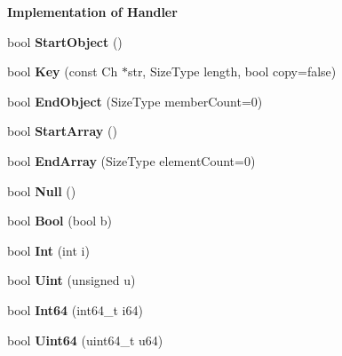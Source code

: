 \begin{Indent}{\bf Implementation of Handler}
\begin{DoxyCompactItemize}
\item 
bool {\bfseries Start\+Object} ()\hypertarget{class_writer_aec3200b2fc80ec87d1c37f775256b2e1}{}\label{class_writer_aec3200b2fc80ec87d1c37f775256b2e1}

\item 
bool {\bfseries Key} (const Ch $\ast$str, Size\+Type length, bool copy=false)\hypertarget{class_writer_a19096d2ccb90761f63ab1240337bf90a}{}\label{class_writer_a19096d2ccb90761f63ab1240337bf90a}

\item 
bool {\bfseries End\+Object} (Size\+Type member\+Count=0)\hypertarget{class_writer_a0771a565261564c27676b7300b11f2b5}{}\label{class_writer_a0771a565261564c27676b7300b11f2b5}

\item 
bool {\bfseries Start\+Array} ()\hypertarget{class_writer_a38715785194b42cd67ba5dd52bf7967e}{}\label{class_writer_a38715785194b42cd67ba5dd52bf7967e}

\item 
bool {\bfseries End\+Array} (Size\+Type element\+Count=0)\hypertarget{class_writer_ac88d533095591a878500b63b351d4013}{}\label{class_writer_ac88d533095591a878500b63b351d4013}

\item 
bool {\bfseries Null} ()\hypertarget{class_writer_af700ed03c8810d48a4aaa3c5baeaf26c}{}\label{class_writer_af700ed03c8810d48a4aaa3c5baeaf26c}

\item 
bool {\bfseries Bool} (bool b)\hypertarget{class_writer_ad7491f4dedb02e7456b240b23ef8c1ad}{}\label{class_writer_ad7491f4dedb02e7456b240b23ef8c1ad}

\item 
bool {\bfseries Int} (int i)\hypertarget{class_writer_ad471415aa7741e732bab0bcfbb9522a8}{}\label{class_writer_ad471415aa7741e732bab0bcfbb9522a8}

\item 
bool {\bfseries Uint} (unsigned u)\hypertarget{class_writer_a5fb0c3228f89f6f9bef15f3e6e6f1739}{}\label{class_writer_a5fb0c3228f89f6f9bef15f3e6e6f1739}

\item 
bool {\bfseries Int64} (int64\+\_\+t i64)\hypertarget{class_writer_a4144d7086ed9d3d807c373de242bde45}{}\label{class_writer_a4144d7086ed9d3d807c373de242bde45}

\item 
bool {\bfseries Uint64} (uint64\+\_\+t u64)\hypertarget{class_writer_a55bb9f286ecdaf4cdb07bddb02e0cb2d}{}\label{class_writer_a55bb9f286ecdaf4cdb07bddb02e0cb2d}


\end{DoxyCompactItemize}
\end{Indent}
